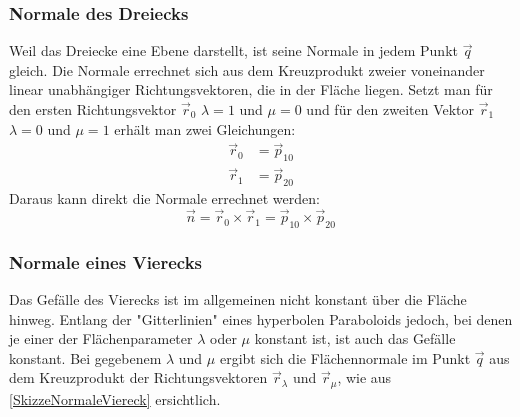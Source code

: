 \subsubsection{Normale des Dreiecks}
Weil das Dreiecke eine Ebene darstellt, ist seine Normale in jedem Punkt $\vec{q}$ gleich. Die Normale errechnet sich aus dem Kreuzprodukt zweier voneinander linear unabhängiger Richtungsvektoren, die in der Fläche liegen. Setzt man für den ersten Richtungsvektor $\vec{r}_{0}$ $\lambda = 1$ und $\mu = 0$ und für den zweiten Vektor $\vec{r}_{1}$ $\lambda = 0$ und $\mu = 1$ erhält man zwei Gleichungen:
\begin{align*}
	\vec{r}_{0} &=  \vec{p}_{10} \\
	\vec{r}_{1} &=  \vec{p}_{20}
\end{align*}
Daraus kann direkt die Normale errechnet werden:
\begin{equation}
	\boxed{
		\vec{n} = \vec{r}_{0} \times \vec{r}_{1} = \vec{p}_{10} \times \vec{p}_{20}
	}
\end{equation}

\subsubsection{Normale eines Vierecks}
Das Gefälle des Vierecks ist im allgemeinen nicht konstant über die Fläche hinweg. Entlang der "Gitterlinien" eines hyperbolen Paraboloids jedoch, bei denen je einer der Flächenparameter $\lambda$ oder $\mu$ konstant ist, ist auch das Gefälle konstant. Bei gegebenem $\lambda$ und $\mu$ ergibt sich die Flächennormale im Punkt $\vec{q}$ aus dem Kreuzprodukt der Richtungsvektoren $\vec{r}_{\lambda}$ und $\vec{r}_{\mu}$, wie aus \cref{SkizzeNormaleViereck} ersichtlich.

